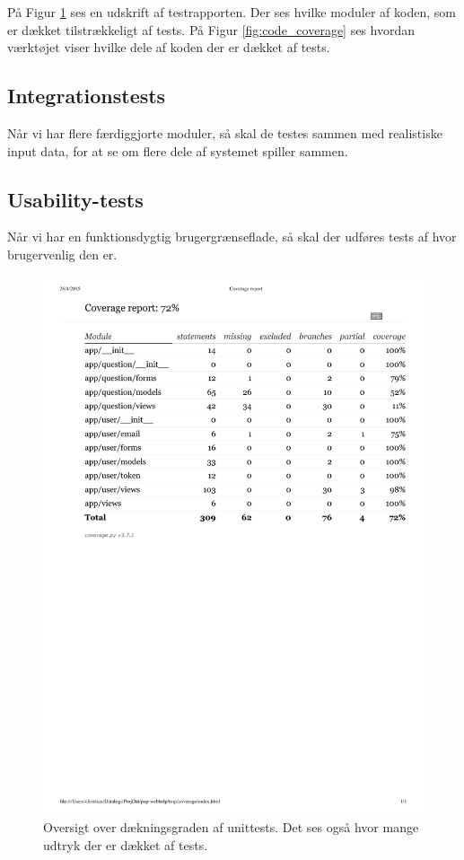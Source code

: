 \documentclass[11pt, a4paper]{article}
\begin{document}
På Figur \ref{fig:testcoverage} ses en udskrift af testrapporten. Der ses hvilke moduler af koden, som er dækket tilstrækkeligt af tests. På Figur \ref{fig:code_coverage} ses hvordan værktøjet viser hvilke dele af koden der er dækket af tests.

\subsection{Integrationstests}
\label{sub:integrationstests}
Når vi har flere færdiggjorte moduler, så skal de testes sammen med realistiske input data, for at se om flere dele af systemet spiller sammen.

\subsection{Usability-tests}
\label{sub:usability_tests}
Når vi har en funktionsdygtig brugergrænseflade, så skal der udføres tests af hvor brugervenlig den er.

\begin{figure}[h]
    \centering
    \includegraphics[width=0.8\linewidth]{figures/testcoverage.pdf}
    \caption{Oversigt over dækningsgraden af unittests. Det ses også hvor mange udtryk der er dækket af tests.}
    \label{fig:testcoverage}
\end{figure}
\end{document}
